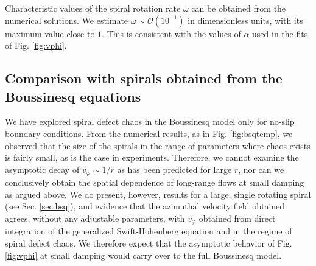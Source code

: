 \documentclass[preprint,prx,floatfix]{revtex4-1}
\begin{document}
Characteristic values of the spiral rotation rate $\omega$ can be obtained from the numerical solutions. We estimate  $\omega \sim \mathcal{O}(10^{-1})$ in dimensionless units, with its maximum value close to $1$. This is consistent with the values of $\alpha$ used in the fits of Fig. \ref{fig:vphi}.

\subsection{Comparison with spirals obtained from the Boussinesq equations}
\label{sec:bsq2}

We have explored spiral defect chaos in the Boussinesq model only for no-slip boundary conditions. From the numerical results, as in Fig. \ref{fig:bsqtemp}, we observed that the size of the spirals in the range of parameters where chaos exists is fairly small, as is the case in experiments. Therefore, we cannot examine the asymptotic decay of $v_{\varphi} \sim 1/r$ as has been predicted for large $r$, nor can we conclusively obtain the spatial dependence of long-range flows at small damping as argued above. We do present, however, results for a large, single rotating spiral (see Sec. \ref{sec:bsq}), and evidence that the azimuthal velocity field obtained agrees, without any adjustable parameters, with $v_{\varphi}$ obtained from direct integration of the generalized Swift-Hohenberg equation and in the regime of spiral defect chaos. We therefore expect that the asymptotic behavior of Fig. \ref{fig:vphi} at small damping would carry over to the full Boussinesq model.
\end{document}
